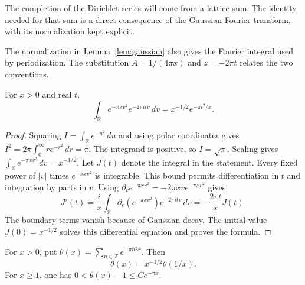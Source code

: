 \documentclass[11pt]{article}
\numberwithin{equation}{section}
\newcommand{\R}{\mathbb R}
\newcommand{\Z}{\mathbb Z}
\begin{document}
The completion of the Dirichlet series will come from a lattice sum.
The identity needed for that sum is a direct consequence of the Gaussian
Fourier transform, with its normalization kept explicit.

The normalization in Lemma~\ref{lem:gaussian} also gives the Fourier
integral used by periodization.  The substitution
$A=1/(4\pi x)$ and $z=-2\pi t$ relates the two conventions.

\begin{lemma}
\label{lem:gaussian-real-transform}
For $x>0$ and real $t$,
\[
 \int_{\R}e^{-\pi xv^2}e^{-2\pi itv}\,dv
       =x^{-1/2}e^{-\pi t^2/x}.
\]
\end{lemma}
\begin{proof}
Squaring $I=\int_{\R}e^{-u^2}\,du$ and using polar coordinates gives
$I^2=2\pi\int_0^\infty re^{-r^2}\,dr=\pi$.
The integrand is positive, so $I=\sqrt\pi$.
Scaling gives $\int_{\R}e^{-\pi xv^2}\,dv=x^{-1/2}$.
Let $J(t)$ denote the integral in the statement.
Every fixed power of $|v|$ times $e^{-\pi xv^2}$ is integrable.
This bound permits differentiation in $t$ and integration by parts in $v$.
Using $\partial_v e^{-\pi xv^2}=-2\pi xv e^{-\pi xv^2}$ gives
\[
 J'(t)=\frac{i}{x}\int_{\R}
       \partial_v(e^{-\pi xv^2})e^{-2\pi itv}\,dv
       =-\frac{2\pi t}{x}J(t).
\]
The boundary terms vanish because of Gaussian decay.
The initial value $J(0)=x^{-1/2}$ solves this differential equation
and proves the formula.
\end{proof}

\begin{lemma}
\label{lem:theta}
For $x>0$, put $\theta(x)=\sum_{n\in\Z}e^{-\pi n^2x}$.
Then
\begin{equation}
 \theta(x)=x^{-1/2}\theta(1/x).
 \label{eq:theta-reflection}
\end{equation}
For $x\geq1$, one has $0<\theta(x)-1\leq C e^{-\pi x}$.
\end{lemma}
\end{document}

